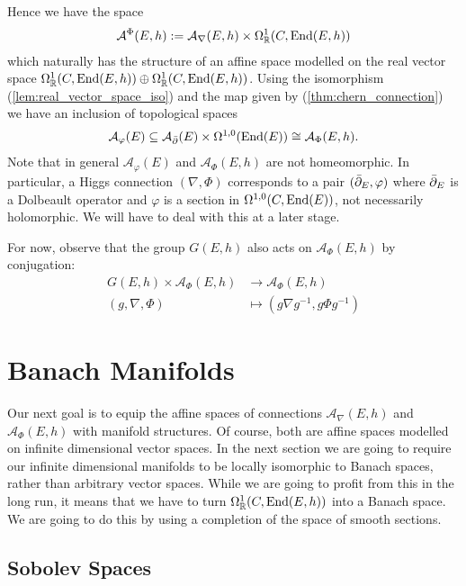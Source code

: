 \documentclass[12pt]{ociamthesis}  %
\begin{document}
Hence we have the space
\begin{align}\label{eq:Higgs_connections_space}
  \mathcal A^{\Phi}(E,h) := \mathcal A_\nabla(E,h) \times \Omega^1_{\mathbb{R}}(C,\operatorname{End}(E,h))
\end{align}
which naturally has the structure of an affine space modelled on
the real vector space
$\Omega^1_{\mathbb{R}}(C,\operatorname{End}(E,h))\oplus\Omega_{\mathbb{R}}^1(C,\operatorname{End}(E,h))$. Using the isomorphism (\ref{lem:real_vector_space_iso})
and the map given by (\ref{thm:chern_connection}) we have an inclusion
of topological spaces
\begin{align*}
  \mathcal A_\varphi(E) \subseteq \mathcal A_{\bar{\partial}} (E) \times \Omega^{1,0}(\operatorname{End}(E)) \cong \mathcal A_\Phi (E,h).
\end{align*}
Note that in general $\mathcal A_\varphi(E)$ and $\mathcal A_\Phi (E,h)$ are not homeomorphic. In
particular, a Higgs connection $(\nabla,\Phi)$ corresponds to
a pair $({\bar{\partial}}_E,\varphi)$ where ${\bar{\partial}}_E$ is a Dolbeault operator and
$\varphi$ is a section in $\Omega^{1,0}(C,\operatorname{End}(E))$, not necessarily
holomorphic. We will have to deal with this at a later stage.

For now, observe that the group $G(E,h)$ also acts on $\mathcal A_\Phi (E,h)$
by conjugation:
\begin{align*}
  G(E,h) \times \mathcal A_\Phi (E,h) & \to \mathcal A_\Phi (E,h)               \\
  (g,\nabla,\Phi)                     & \mapsto (g\nabla{g}^{-1},g\Phi{g}^{-1})
\end{align*}

\section{Banach Manifolds}

Our next goal is to equip the affine spaces of connections $\mathcal A_\nabla(E,h)$
and $\mathcal A_\Phi (E,h)$ with manifold structures. Of course, both are affine
spaces modelled on infinite dimensional vector spaces. In the next
section we are going to require our infinite dimensional manifolds to
be locally isomorphic to Banach spaces, rather than arbitrary
vector spaces. While we are going to profit from this in the long run,
it means that we have to turn $\Omega^1_{\mathbb{R}}(C,\operatorname{End}(E,h))$
into a Banach space. We are going to do this by using a completion of
the space of smooth sections.

\subsection{Sobolev Spaces}
\end{document}
